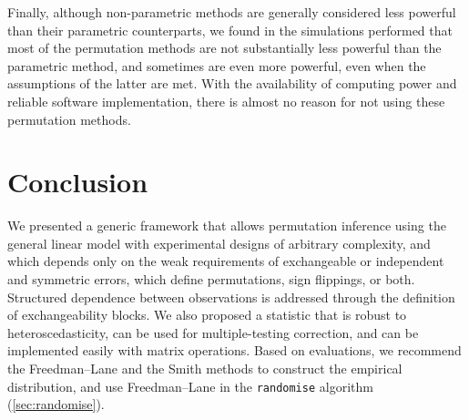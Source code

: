 Finally, although non-parametric methods are generally considered less powerful than their parametric counterparts, we found in the simulations performed that most of the permutation methods are not substantially less powerful than the parametric method, and sometimes are even more powerful, even when the assumptions of the latter are met. With the availability of computing power and reliable software implementation, there is almost no reason for not using these permutation methods.

\section{Conclusion}

We presented a generic framework that allows permutation inference using the general linear model with experimental designs of arbitrary complexity, and which depends only on the weak requirements of exchangeable or independent and symmetric errors, which define permutations, sign flippings, or both. Structured dependence between observations is addressed through the definition of exchangeability blocks. We also proposed a statistic that is robust to heteroscedasticity, can be used for multiple-testing correction, and can be implemented easily with matrix operations. Based on evaluations, we recommend the Freedman--Lane and the Smith methods to construct the empirical distribution, and use Freedman--Lane in the \texttt{randomise} algorithm (\ref{sec:randomise}).
